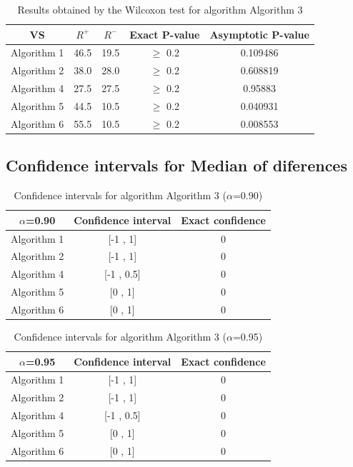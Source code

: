\documentclass[a4paper,10pt]{article}
\begin{document}
\begin{table}[!htp]
\centering\small
\begin{tabular}{
|c|c|c|c|c|}
\hline
 VS & $R^{+}$ & $R^{-}$ & Exact P-value & Asymptotic P-value \\ \hline 
Algorithm 1 & 46.5 & 19.5 & $\geq$ 0.2 & 0.109486\\ \hline 
Algorithm 2 & 38.0 & 28.0 & $\geq$ 0.2 & 0.608819\\ \hline 
Algorithm 4 & 27.5 & 27.5 & $\geq$ 0.2 & 0.95883\\ \hline 
Algorithm 5 & 44.5 & 10.5 & $\geq$ 0.2 & 0.040931\\ \hline 
Algorithm 6 & 55.5 & 10.5 & $\geq$ 0.2 & 0.008553\\ \hline 

\end{tabular}
\caption{Results obtained by the Wilcoxon test for algorithm Algorithm 3}
\end{table}

\subsection{Confidence intervals for Median of diferences}

\begin{table}[!htp]
\centering\small
\begin{tabular}{
|c|c|c|}
\hline
 $\alpha$=0.90 & Confidence interval & Exact confidence \\ \hline 
Algorithm 1 & [-1 , 1] & 0\\ \hline 
Algorithm 2 & [-1 , 1] & 0\\ \hline 
Algorithm 4 & [-1 , 0.5] & 0\\ \hline 
Algorithm 5 & [0 , 1] & 0\\ \hline 
Algorithm 6 & [0 , 1] & 0\\ \hline 

\end{tabular}
\caption{Confidence intervals for algorithm Algorithm 3 ($\alpha$=0.90)}
\end{table}
\begin{table}[!htp]
\centering\small
\begin{tabular}{
|c|c|c|}
\hline
 $\alpha$=0.95 & Confidence interval & Exact confidence \\ \hline 
Algorithm 1 & [-1 , 1] & 0\\ \hline 
Algorithm 2 & [-1 , 1] & 0\\ \hline 
Algorithm 4 & [-1 , 0.5] & 0\\ \hline 
Algorithm 5 & [0 , 1] & 0\\ \hline 
Algorithm 6 & [0 , 1] & 0\\ \hline 

\end{tabular}
\caption{Confidence intervals for algorithm Algorithm 3 ($\alpha$=0.95)}
\end{table}
\end{document}
